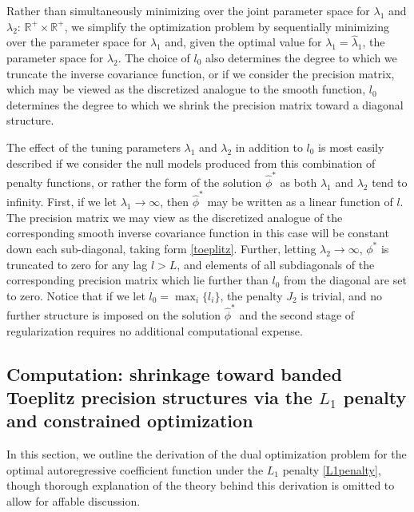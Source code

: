 \documentclass[12pt]{article}
\begin{document}
Rather than simultaneously minimizing over the joint parameter space for $\lambda_1$ and $\lambda_2$: $\mathbb{R}^+\times\mathbb{R}^+$, we simplify the optimization problem by sequentially minimizing over the parameter space for $\lambda_1$ and,  given the optimal value for $\lambda_1= \hat{\lambda}_1$, the parameter space for $\lambda_2$. The choice of $l_0$ also determines the degree to which we truncate the inverse covariance function, or if we consider the precision matrix, which may be viewed as the discretized analogue to the smooth function, $l_0$ determines the degree to which we shrink the precision matrix toward a diagonal structure.

The effect of the tuning parameters $\lambda_1$ and $\lambda_2$ in addition to $l_0$ is most easily described if we consider the null models produced from this combination of penalty functions, or rather the form of the solution $\hat{\phi}^*$ as both $\lambda_1$ and $\lambda_2$ tend to infinity. First, if we let $\lambda_1 \rightarrow \infty$, then $\hat{\phi}^*$ may be written as a linear function of $l$. The precision matrix we may view as the discretized analogue of the corresponding smooth inverse covariance function in this case will be constant down each sub-diagonal, taking form \eqref{toeplitz}. Further, letting $\lambda_2 \rightarrow \infty$, $\phi^*$ is truncated to zero for any lag $l>L$, and elements of all subdiagonals of the corresponding precision matrix which lie further than $l_0$ from the diagonal are set to zero. Notice that if we let $l_0 = \mathop{\max}_{i} \lbrace l_i \rbrace$, the penalty $J_2$ is trivial, and no further structure is imposed on the solution $\hat{\phi}^*$ and the second stage of regularization requires no additional computational expense. 








\subsection{Computation: shrinkage toward banded Toeplitz precision structures via the $L_1$ penalty and constrained optimization }

In this section, we outline the derivation of the dual optimization problem for the optimal autoregressive coefficient function under the $L_1$ penalty \eqref{L1penalty}, though thorough explanation of the theory behind this derivation is omitted to allow for affable discussion.
\end{document}
